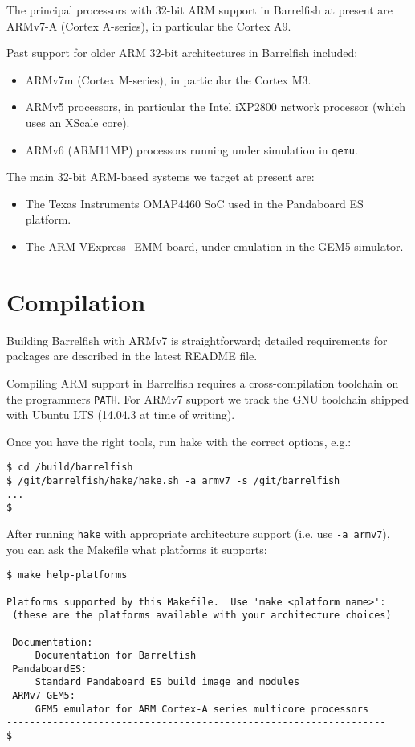 \documentclass[a4paper,twoside]{report} %
\begin{document}
The principal processors with 32-bit ARM support in Barrelfish at present are
ARMv7-A (Cortex A-series), in particular the Cortex A9. 

Past support for older ARM 32-bit architectures in Barrelfish included:
\begin{itemize}
\item ARMv7m (Cortex M-series), in particular the Cortex M3. 
\item ARMv5 processors, in particular the Intel iXP2800 network
  processor (which uses an XScale core). 
\item ARMv6 (ARM11MP) processors running under simulation in
  \texttt{qemu}. 
\end{itemize}

The main 32-bit ARM-based systems we target at present are:
\begin{itemize}
\item The Texas Instruments OMAP4460 SoC used in the Pandaboard ES
  platform. 
\item The ARM VExpress\_EMM board, under emulation in the GEM5
  simulator. 
\end{itemize}

\chapter{Compilation}
\label{sec:armcompile}

Building Barrelfish with ARMv7 is straightforward; detailed
requirements for packages are described in the latest README file.

Compiling ARM support in Barrelfish requires a cross-compilation
toolchain on the programmers \texttt{PATH}.  For ARMv7 support we
track the GNU toolchain shipped with Ubuntu LTS  (14.04.3 at time of
writing). 

Once you have the right tools, run hake with the correct options,
e.g.:
\begin{lstlisting}
$ cd /build/barrelfish
$ /git/barrelfish/hake/hake.sh -a armv7 -s /git/barrelfish 
...
$
\end{lstlisting}

After running \texttt{hake} with appropriate architecture support
(i.e. use \texttt{-a armv7}), you can ask the Makefile what platforms it
supports:

\begin{lstlisting}
$ make help-platforms
------------------------------------------------------------------
Platforms supported by this Makefile.  Use 'make <platform name>':
 (these are the platforms available with your architecture choices)

 Documentation:
	 Documentation for Barrelfish
 PandaboardES:
	 Standard Pandaboard ES build image and modules
 ARMv7-GEM5:
	 GEM5 emulator for ARM Cortex-A series multicore processors
------------------------------------------------------------------
$ 
\end{lstlisting}
\end{document}
